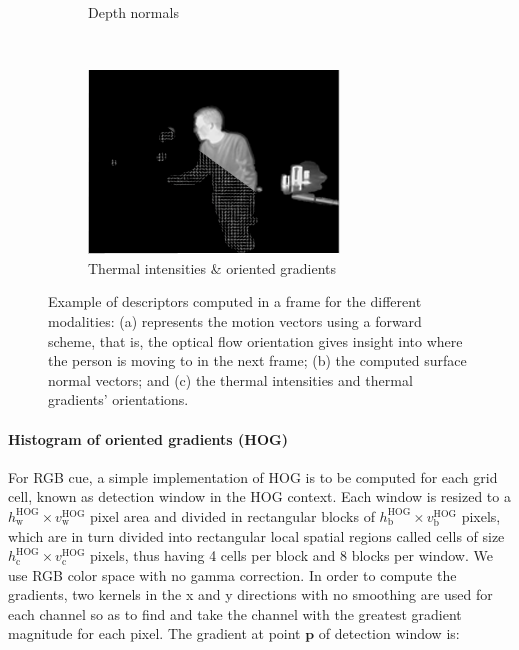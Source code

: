 \documentclass[10pt,twocolumn,letterpaper]{article}
\begin{document}
\begin{figure}[ht]
\begin{subfigure}[b]{0.32\textwidth}
                \caption{Depth normals}
                \label{fig:normals}
        \end{subfigure}\,
        \begin{subfigure}[b]{0.33\textwidth}
                \includegraphics[width=\textwidth]{hihog.png}
                \caption{Thermal intensities \& oriented gradients}
                \label{fig:thermals}
        \end{subfigure}	
        \caption{Example of descriptors computed in a frame for the different modalities: (a) represents the motion vectors using a forward scheme, that is, the optical flow orientation gives insight into where the person is moving to in the next frame; (b) the computed surface normal vectors; and (c) the thermal intensities and thermal gradients' orientations. }\label{fig:descriptors}
\end{figure}

\paragraph{Histogram of oriented gradients (HOG)}
For RGB cue, a simple implementation of HOG \cite{dalal2005histograms} is to be computed for each grid cell, known as detection window in the HOG context. Each window is resized to a $h_\mathrm{w}^\mathrm{HOG} \times v_\mathrm{w}^\mathrm{HOG}$ pixel area and divided in rectangular blocks of $h_\mathrm{b}^\mathrm{HOG} \times v_\mathrm{b}^\mathrm{HOG}$ pixels, which are in turn divided into rectangular local spatial regions called cells of size $h_\mathrm{c}^\mathrm{HOG} \times v_\mathrm{c}^\mathrm{HOG}$ pixels, thus having 4 cells per block and 8 blocks per window. We use RGB color space with no gamma correction. In order to compute the gradients, two kernels in the x and y directions with no smoothing are used for each channel so as to find and take the channel with the greatest gradient magnitude for each pixel. The gradient at point $\mathbf{p}$ of detection window is:
\end{document}

